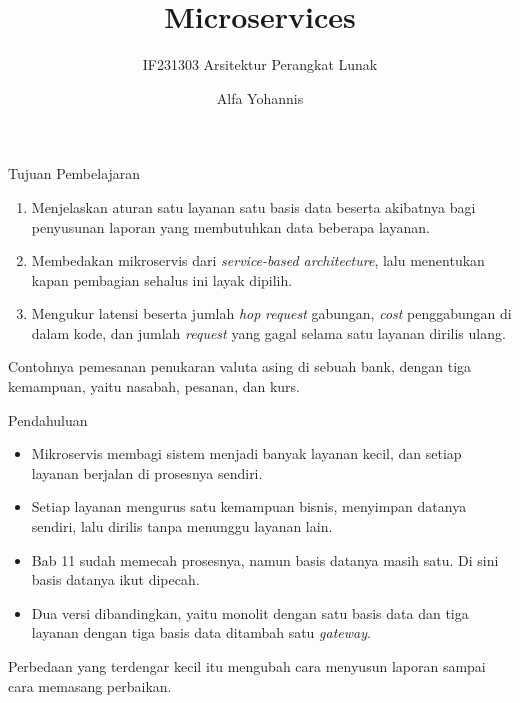 \documentclass[aspectratio=169, table, 12pt]{beamer}
\title{\Huge{Microservices}}
\subtitle{IF231303 Arsitektur Perangkat Lunak}
\author{Alfa Yohannis}
\begin{document}
\frame{\titlepage}

\begin{frame}{{\Large Tujuan Pembelajaran}}
  \vspace{10pt}
  \begin{enumerate}
    \item Menjelaskan aturan satu layanan satu basis data beserta akibatnya
          bagi penyusunan laporan yang membutuhkan data beberapa layanan.
    \item Membedakan mikroservis dari \textit{service-based architecture},
          lalu menentukan kapan pembagian sehalus ini layak dipilih.
    \item Mengukur latensi beserta jumlah \textit{hop} \textit{request}
          gabungan, \textit{cost} penggabungan di dalam kode, dan jumlah
          \textit{request} yang gagal selama satu layanan dirilis ulang.
  \end{enumerate}

  \vspace{10pt}
  {\small Contohnya pemesanan penukaran valuta asing di sebuah bank, dengan
  tiga kemampuan, yaitu nasabah, pesanan, dan kurs.}
\end{frame}

\begin{frame}{{\Large Pendahuluan}}
  \vspace{10pt}
  \begin{itemize}\small
    \item Mikroservis membagi sistem menjadi banyak layanan kecil, dan setiap
          layanan berjalan di prosesnya sendiri.
    \item Setiap layanan mengurus satu kemampuan bisnis, menyimpan datanya
          sendiri, lalu dirilis tanpa menunggu layanan lain.
    \item Bab 11 sudah memecah prosesnya, namun basis datanya masih satu.
          Di sini basis datanya ikut dipecah.
    \item Dua versi dibandingkan, yaitu monolit dengan satu basis data dan
          tiga layanan dengan tiga basis data ditambah satu \textit{gateway}.
  \end{itemize}

  \vspace{8pt}
  {\small Perbedaan yang terdengar kecil itu mengubah cara menyusun laporan
  sampai cara memasang perbaikan.}
\end{frame}
\end{document}
